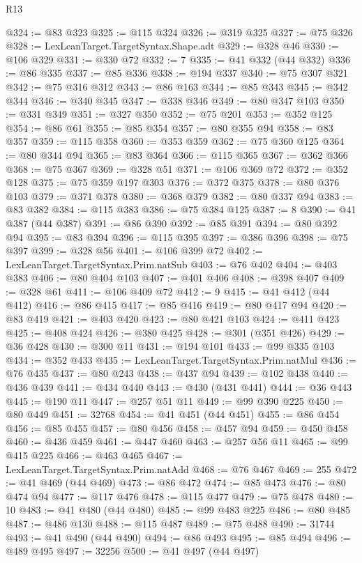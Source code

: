 \begin{lexlean}{R13}
\begin{coremodule}
@324 := @83 @323
@325 := @115 @324
@326 := @319 @325
@327 := @75 @326
@328 := LexLeanTarget.TargetSyntax.Shape.adt
@329 := @328 @46
@330 := @106 @329
@331 := @330 @72
@332 := 7
@335 := @41 @332 (@44 @332)
@336 := @86 @335
@337 := @85 @336
@338 := @194 @337
@340 := @75 @307 @321
@342 := @75 @316 @312
@343 := @86 @163
@344 := @85 @343
@345 := @342 @344
@346 := @340 @345
@347 := @338 @346
@349 := @80 @347 @103
@350 := @331 @349
@351 := @327 @350
@352 := @75 @201
@353 := @352 @125
@354 := @86 @61
@355 := @85 @354
@357 := @80 @355 @94
@358 := @83 @357
@359 := @115 @358
@360 := @353 @359
@362 := @75 @360 @125
@364 := @80 @344 @94
@365 := @83 @364
@366 := @115 @365
@367 := @362 @366
@368 := @75 @367
@369 := @328 @51
@371 := @106 @369 @72
@372 := @352 @128
@375 := @75 @359 @197 @303
@376 := @372 @375
@378 := @80 @376 @103
@379 := @371 @378
@380 := @368 @379
@382 := @80 @337 @94
@383 := @83 @382
@384 := @115 @383
@386 := @75 @384 @125
@387 := 8
@390 := @41 @387 (@44 @387)
@391 := @86 @390
@392 := @85 @391
@394 := @80 @392 @94
@395 := @83 @394
@396 := @115 @395
@397 := @386 @396
@398 := @75 @397
@399 := @328 @56
@401 := @106 @399 @72
@402 := LexLeanTarget.TargetSyntax.Prim.natSub
@403 := @76 @402
@404 := @403 @383
@406 := @80 @404 @103
@407 := @401 @406
@408 := @398 @407
@409 := @328 @61
@411 := @106 @409 @72
@412 := 9
@415 := @41 @412 (@44 @412)
@416 := @86 @415
@417 := @85 @416
@419 := @80 @417 @94
@420 := @83 @419
@421 := @403 @420
@423 := @80 @421 @103
@424 := @411 @423
@425 := @408 @424
@426 := @380 @425
@428 := @301 (@351 @426)
@429 := @36 @428
@430 := @300 @11
@431 := @194 @101
@433 := @99 @335 @103
@434 := @352 @433
@435 := LexLeanTarget.TargetSyntax.Prim.natMul
@436 := @76 @435
@437 := @80 @243
@438 := @437 @94
@439 := @102 @438
@440 := @436 @439
@441 := @434 @440
@443 := @430 (@431 @441)
@444 := @36 @443
@445 := @190 @11
@447 := @257 @51 @11
@449 := @99 @390 @225
@450 := @80 @449
@451 := 32768
@454 := @41 @451 (@44 @451)
@455 := @86 @454
@456 := @85 @455
@457 := @80 @456
@458 := @457 @94
@459 := @450 @458
@460 := @436 @459
@461 := @447 @460
@463 := @257 @56 @11
@465 := @99 @415 @225
@466 := @463 @465
@467 := LexLeanTarget.TargetSyntax.Prim.natAdd
@468 := @76 @467
@469 := 255
@472 := @41 @469 (@44 @469)
@473 := @86 @472
@474 := @85 @473
@476 := @80 @474 @94
@477 := @117 @476
@478 := @115 @477
@479 := @75 @478
@480 := 10
@483 := @41 @480 (@44 @480)
@485 := @99 @483 @225
@486 := @80 @485
@487 := @486 @130
@488 := @115 @487
@489 := @75 @488
@490 := 31744
@493 := @41 @490 (@44 @490)
@494 := @86 @493
@495 := @85 @494
@496 := @489 @495
@497 := 32256
@500 := @41 @497 (@44 @497)

\end{coremodule}
\end{lexlean}
